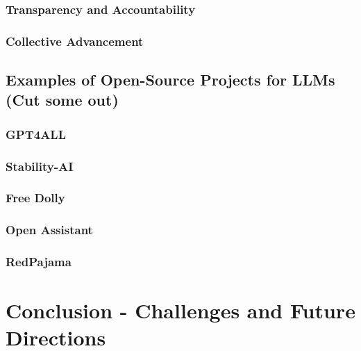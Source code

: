 \documentclass[
]{book}
\begin{document}
\hypertarget{transparency-and-accountability}{%
\subsection{Transparency and Accountability}\label{transparency-and-accountability}}

\hypertarget{collective-advancement}{%
\subsection{Collective Advancement}\label{collective-advancement}}

\hypertarget{examples-of-open-source-projects-for-llms-cut-some-out}{%
\section{Examples of Open-Source Projects for LLMs (Cut some out)}\label{examples-of-open-source-projects-for-llms-cut-some-out}}

\hypertarget{gpt4all}{%
\subsection{GPT4ALL}\label{gpt4all}}

\hypertarget{stability-ai}{%
\subsection{Stability-AI}\label{stability-ai}}

\hypertarget{free-dolly}{%
\subsection{Free Dolly}\label{free-dolly}}

\hypertarget{open-assistant}{%
\subsection{Open Assistant}\label{open-assistant}}

\hypertarget{redpajama}{%
\subsection{RedPajama}\label{redpajama}}

\hypertarget{conclusion---challenges-and-future-directions}{%
\chapter{Conclusion - Challenges and Future Directions}\label{conclusion---challenges-and-future-directions}}
\end{document}
